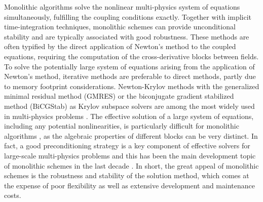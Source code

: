 Monolithic algorithms solve the nonlinear multi-physics system of equations simultaneously, fulfilling the coupling conditions exactly.
Together with implicit time-integration techniques, monolithic schemes can provide unconditional stability and are typically associated with good robustness.
These methods are often typified by the direct application of Newton's method to the coupled equations, requiring the computation of the cross-derivative blocks between fields.
To solve the potentially large system of equations arising from the application of Newton's method, iterative methods are preferable to direct methods, partly due to memory footprint considerations.
Newton-Krylov methods with the generalized minimal residual method (GMRES) or the biconjugate gradient stabilized method (BiCGStab) as Krylov subspace solvers are among the most widely used in multi-physics problems  \citep{hron_monolithic_2006}.
The effective solution of a large system of equations, including any potential nonlinearities, is particularly difficult for monolithic algorithms \citep{danowski_monolithic_2013}, as the algebraic properties of different blocks can be very distinct.
In fact, a good preconditioning strategy is a key component of effective solvers for large-scale multi-physics problems and this has been the main development topic of monolithic schemes in the last decade \citep{tezduyar2006space, lin_parallel_2010, gee_truly_2011, danowski_monolithic_2013, verdugo_unified_2016, mayr_hybrid_2020}.
In short, the great appeal of monolithic schemes is the robustness and stability of the solution method, which comes at the expense of poor flexibility as well as extensive development and maintenance costs.

